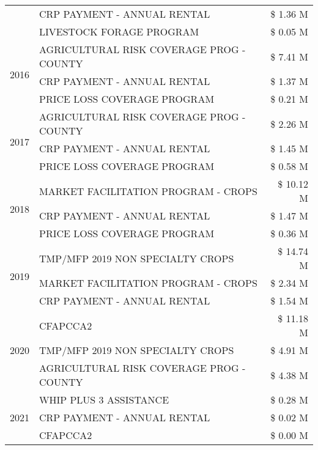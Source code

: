 \begin{tabular}{llr}
 & CRP PAYMENT - ANNUAL RENTAL & \$ 1.36 M \\
 & LIVESTOCK FORAGE PROGRAM & \$ 0.05 M \\
\cline{1-3}
\multirow[t]{3}{*}{2016} & AGRICULTURAL RISK COVERAGE PROG - COUNTY & \$ 7.41 M \\
 & CRP PAYMENT - ANNUAL RENTAL & \$ 1.37 M \\
 & PRICE LOSS COVERAGE PROGRAM & \$ 0.21 M \\
\cline{1-3}
\multirow[t]{3}{*}{2017} & AGRICULTURAL RISK COVERAGE PROG - COUNTY & \$ 2.26 M \\
 & CRP PAYMENT - ANNUAL RENTAL & \$ 1.45 M \\
 & PRICE LOSS COVERAGE PROGRAM & \$ 0.58 M \\
\cline{1-3}
\multirow[t]{3}{*}{2018} & MARKET FACILITATION PROGRAM - CROPS & \$ 10.12 M \\
 & CRP PAYMENT - ANNUAL RENTAL & \$ 1.47 M \\
 & PRICE LOSS COVERAGE PROGRAM & \$ 0.36 M \\
\cline{1-3}
\multirow[t]{3}{*}{2019} & TMP/MFP 2019 NON SPECIALTY CROPS & \$ 14.74 M \\
 & MARKET FACILITATION PROGRAM - CROPS & \$ 2.34 M \\
 & CRP PAYMENT - ANNUAL RENTAL & \$ 1.54 M \\
\cline{1-3}
\multirow[t]{3}{*}{2020} & CFAPCCA2 & \$ 11.18 M \\
 & TMP/MFP 2019 NON SPECIALTY CROPS & \$ 4.91 M \\
 & AGRICULTURAL RISK COVERAGE PROG - COUNTY & \$ 4.38 M \\
\cline{1-3}
\multirow[t]{3}{*}{2021} & WHIP PLUS 3 ASSISTANCE & \$ 0.28 M \\
 & CRP PAYMENT - ANNUAL RENTAL & \$ 0.02 M \\
 & CFAPCCA2 & \$ 0.00 M \\
\cline{1-3}
\bottomrule
\end{tabular}
